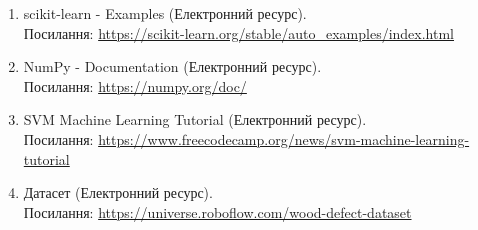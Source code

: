 \documentclass[oneside,14pt]{extarticle}
\begin{document}
\begin{enumerate}
	\item scikit-learn - Examples (Електронний ресурс). \\Посилання: \href{https://scikit-learn.org/stable/auto_examples/index.html}{https://scikit-learn.org/stable/auto\_examples/index.html}
	\item NumPy - Documentation (Електронний ресурс). \\Посилання: \href{https://numpy.org/doc/}{https://numpy.org/doc/}
	\item SVM Machine Learning Tutorial (Електронний ресурс). \\Посилання: \href{https://www.freecodecamp.org/news/svm-machine-learning-tutorial-what-is-the-support-vector-machine-algorithm-explained-with-code-examples/}{https://www.freecodecamp.org/news/svm-machine-learning-tutorial}
	\item Датасет (Електронний ресурс). \\Посилання: \href{https://universe.roboflow.com/wood-defect-dataset}{https://universe.roboflow.com/wood-defect-dataset}
\end{enumerate}
\end{document}
